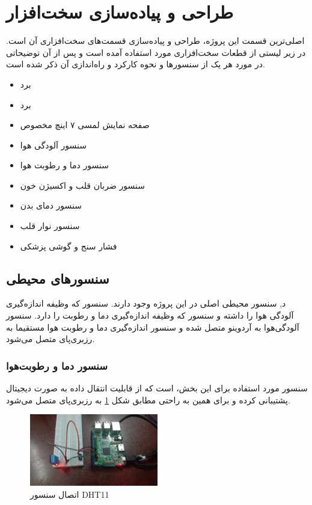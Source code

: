 \section{طراحی و پیاده‌سازی سخت‌افزار}

اصلی‌ترین قسمت این پروژه، طراحی و پیاده‌سازی قسمت‌های سخت‌افزاری آن است. در زیر لیستی از قطعات سخت‌افزاری مورد استفاده آمده است و پس‌ از آن توضیحاتی در مورد هر یک از سنسور‌ها و نحوه کارکرد و راه‌اندازی آن ذکر شده است.


\begin{itemize}
	\item برد 
	\item برد 
	\item صفحه نمایش لمسی ۷ اینچ مخصوص 
	\item سنسور آلودگی هوا 
	\item سنسور دما و رطوبت هوا 
	\item سنسور ضربان قلب و اکسیژن‌ خون 
	\item سنسور دمای بدن 
	\item سنسور نوار قلب 
	\item فشار سنج و گوشی پزشکی
\end{itemize}


\subsection{سنسورهای محیطی}

د, سنسور محیطی اصلی در این پروژه وجود دارند. سنسور  که وظیفه اندازه‌گیری آلودگی هوا را داشته و سنسور  که وظیفه اندازه‌گیری دما و رطوبت را دارد. سنسور آلودگی‌هوا به آردوینو متصل شده و سنسور اندازه‌گیری دما و رطوبت هوا مستقیما به رزبری‌پای متصل می‌شود.


\subsubsection{سنسور دما و رطوبت‌هوا}

سنسور مورد استفاده برای این بخش،  است که از قابلیت انتقال داده به صورت دیجیتال پشتیبانی کرده و برای همین به راحتی مطابق شکل \ref{fig:2} به رزبری‌پای متصل می‌شود.

\begin{figure}[h]
	\centering
	\includegraphics[width=0.5\textwidth]{figs/dht11.jpg}
	
	\caption{اتصال سنسور DHT11}
	\label{fig:2}
\end{figure}

